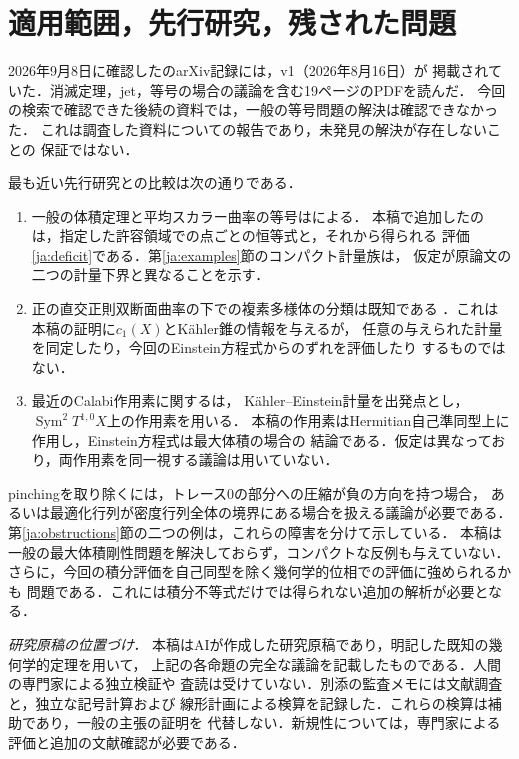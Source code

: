 \documentclass[12pt]{amsart}
\theoremstyle{definition}
\theoremstyle{remark}
\numberwithin{equation}{section}
\DeclareMathOperator{\Sym}{Sym}
\theoremstyle{plain}
\theoremstyle{remark}
\theoremstyle{definition}
\begin{document}
\section{適用範囲，先行研究，残された問題}

2026年9月8日に確認した\cite{ja:DS}のarXiv記録には，v1（2026年8月16日）が
掲載されていた．消滅定理，jet，等号の場合の議論を含む19ページのPDFを読んだ．
今回の検索で確認できた後続の資料では，一般の等号問題の解決は確認できなかった．
これは調査した資料についての報告であり，未発見の解決が存在しないことの
保証ではない．

最も近い先行研究との比較は次の通りである．
\begin{enumerate}
\item 一般の体積定理と平均スカラー曲率の等号は\cite{ja:DS}による．
本稿で追加したのは，指定した許容領域での点ごとの恒等式と，それから得られる
評価\eqref{ja:deficit}である．第\ref{ja:examples}節のコンパクト計量族は，
仮定が原論文の二つの計量下界と異なることを示す．
\item 正の直交正則双断面曲率の下での複素多様体の分類は既知である
\cite{ja:FLW}．これは本稿の証明に$c_1(X)$とK\"ahler錐の情報を与えるが，
任意の与えられた計量を同定したり，今回のEinstein方程式からのずれを評価したり
するものではない．
\item 最近のCalabi作用素に関する\cite[Theorem 1.4]{ja:DFL}は，
K\"ahler--Einstein計量を出発点とし，$\Sym^2T^{1,0}X$上の作用素を用いる．
本稿の作用素はHermitian自己準同型上に作用し，Einstein方程式は最大体積の場合の
結論である．仮定は異なっており，両作用素を同一視する議論は用いていない．
\end{enumerate}

pinchingを取り除くには，トレース0の部分への圧縮が負の方向を持つ場合，
あるいは最適化行列が密度行列全体の境界にある場合を扱える議論が必要である．
第\ref{ja:obstructions}節の二つの例は，これらの障害を分けて示している．
本稿は一般の最大体積剛性問題を解決しておらず，コンパクトな反例も与えていない．
さらに，今回の積分評価を自己同型を除く幾何学的位相での評価に強められるかも
問題である．これには積分不等式だけでは得られない追加の解析が必要となる．

\medskip
\noindent\textit{研究原稿の位置づけ．}
本稿はAIが作成した研究原稿であり，明記した既知の幾何学的定理を用いて，
上記の各命題の完全な議論を記載したものである．人間の専門家による独立検証や
査読は受けていない．別添の監査メモには文献調査と，独立な記号計算および
線形計画による検算を記録した．これらの検算は補助であり，一般の主張の証明を
代替しない．新規性については，専門家による評価と追加の文献確認が必要である．
\end{document}
